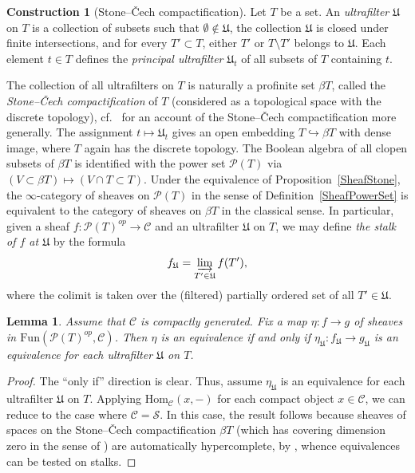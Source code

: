 \documentclass[reqno]{amsart}
\newtheorem{lemma}[theorem]{Lemma}
\theoremstyle{definition}
\newtheorem{cons}[theorem]{Construction}
\begin{document}
\begin{cons}[Stone--\v{C}ech compactification] 
\label{SCcompact}
\label{StoneCech}
Let $T$ be a set. An \emph{ultrafilter} $\mathfrak{U}$ on $T$ is a collection
of subsets such that $\emptyset \notin \mathfrak{U}$, the
collection $\mathfrak{U}$ is closed
under finite intersections, and for every $T' \subset T$, either $T'$ or $T
\setminus T'$ belongs to $\mathfrak{U}$. Each element $t \in T$ defines the {\em
principal ultrafilter} $\mathfrak{U}_t$ of all subsets of $T$ containing $t$.

The collection of all ultrafilters on $T$ is naturally a profinite set $\beta
T$, called the {\em Stone--\v{C}ech compactification} of $T$ (considered as a
topological space with the discrete topology), cf.~\cite[Ch.~6]{GJ60} for an
account of the Stone--\v{C}ech compactification more generally. The assignment $t
\mapsto \mathfrak{U}_t$ gives an open embedding $T \hookrightarrow \beta T$ with
dense image, where $T$ again has the discrete topology. The Boolean algebra of all
clopen subsets of $\beta T$ is identified with the power set $\mathcal{P}(T)$
via $(V \subset \beta T) \mapsto (V \cap T \subset T)$. Under the equivalence of
Proposition~\ref{SheafStone}, the $\infty$-category of sheaves on $\mathcal{P}(T)$ in the sense of Definition~\ref{SheafPowerSet} is equivalent to the category of sheaves on $\beta T$ in the classical sense. In particular, given a sheaf $f\colon  \mathcal{P}(T)^{op} \to \mathcal{C}$ and an ultrafilter
$\mathfrak{U}$ on $T$, we may define {\em the stalk of $f$ at $\mathfrak{U}$} by the formula  
\[ f_{\mathfrak{U}} = \varinjlim_{T' \in \mathfrak{U}} f(T'),\] 
where the colimit is taken over the (filtered) partially ordered set of all $T' \in \mathfrak{U}$.
\end{cons}

\begin{lemma} 
\label{checkequivalence}
Assume that $\mathcal{C} $ is compactly generated. Fix a map $\eta\colon f \to
g$ of sheaves in $\mathrm{Fun}( \mathcal{P}(T)^{op}, \mathcal{C})$. Then $\eta$
is an equivalence if and only if $\eta_{\mathfrak{U}} \colon f_{\mathfrak{U}} \to g_{\mathfrak{U}}$ is an equivalence  for each ultrafilter $\mathfrak{U}$ on $T$.
\end{lemma} 
\begin{proof} 
The ``only if'' direction is clear. Thus, assume $\eta_{\mathfrak{U}}$ is an equivalence for each ultrafilter $\mathfrak{U}$ on $T$. 
Applying $\mathrm{Hom}_{\mathcal{C}}(x, -)$ for each compact object $x \in
\mathcal{C}$, we can reduce to the case 
where $\mathcal{C} = \mathcal{S}$. 
In this case, the result follows because sheaves of spaces on the 
Stone--\v{C}ech compactification $\beta T$ (which has covering dimension zero
in the sense of \cite[Def.~7.2.3.1]{HTT}) are automatically hypercomplete, by
\cite[Th.~7.2.3.6]{HTT}, whence equivalences can be tested on stalks. 
\end{proof} 
\end{document}
